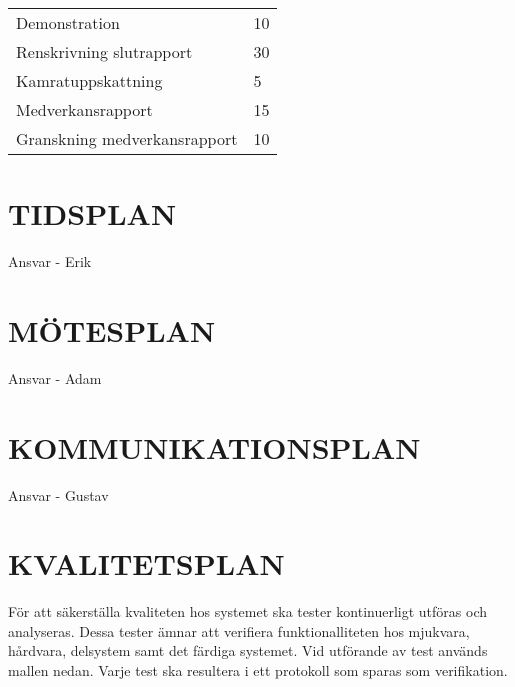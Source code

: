 \documentclass[a4paper]{article}
\begin{document}
\begin{table}[htb]
\begin{tabular}{|l|l|}
Demonstration                                             & 10               \\
Renskrivning slutrapport                                  & 30               \\
Kamratuppskattning                                        & 5                \\
Medverkansrapport                                         & 15               \\
Granskning medverkansrapport                              & 10               \\ \hline
\end{tabular}
\end{table}

\section{TIDSPLAN}
\label{sec:tidsplan}

Ansvar - Erik

\section{MÖTESPLAN}
\label{sec:mötesplan}

Ansvar - Adam

\section{KOMMUNIKATIONSPLAN}
\label{sec:komm}

Ansvar - Gustav

\section{KVALITETSPLAN}
\label{sec:kval}

För att säkerställa kvaliteten hos systemet ska tester kontinuerligt utföras och analyseras. Dessa tester ämnar att verifiera funktionalliteten hos mjukvara, hårdvara, delsystem samt det färdiga systemet. Vid utförande av test används mallen nedan. Varje test ska resultera i ett protokoll som sparas som verifikation.
\end{document}

